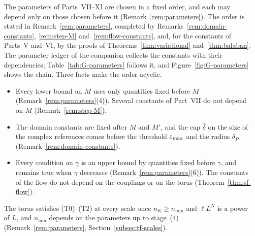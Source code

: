 \label{g:parameters}



The parameters of Parts~VII--XI are chosen in a fixed order, and each may depend only on those chosen before it (Remark~\ref{rem:parameters}). The order is stated in Remark~\ref{rem:parameters}, completed by Remarks~\ref{rem:domain-constants}, \ref{rem:step-M} and~\ref{rem:flow-constants}, and, for the constants of Parts~V and~VI, by the proofs of Theorems~\ref{thm:variational} and~\ref{thm:balaban}. The parameter ledger of the companion collects the constants with their dependencies; Table~\ref{tab:G-parameters} follows it, and Figure~\ref{fig:G-parameters} shows the chain. Three facts make the order acyclic.
\begin{itemize}
\item Every lower bound on $M$ uses only quantities fixed before $M$ (Remark~\ref{rem:parameters}(4)). Several constants of Part~VII do not depend on $M$ (Remark~\ref{rem:step-M}).
\item The domain constants are fixed after $M$ and $M'$, and the cap $\bar\delta$ on the size of the complex references comes before the threshold $\varepsilon_{\max}$ and the radius $\delta_P$ (Remark~\ref{rem:domain-constants}).
\item Every condition on $\gamma$ is an upper bound by quantities fixed before $\gamma$, and remains true when $\gamma$ decreases (Remark~\ref{rem:parameters}(6)). The constants of the flow do not depend on the couplings or on the torus (Theorem~\ref{thm:sf-flow}).
\end{itemize}
The torus satisfies (T0)--(T2) at every scale once $n_K\ge n_{\min}$ and $\ell L^N$ is a power of $L$, and $n_{\min}$ depends on the parameters up to stage~(4) (Remark~\ref{rem:parameters}, Section~\ref{subsec:tf-scales}).

